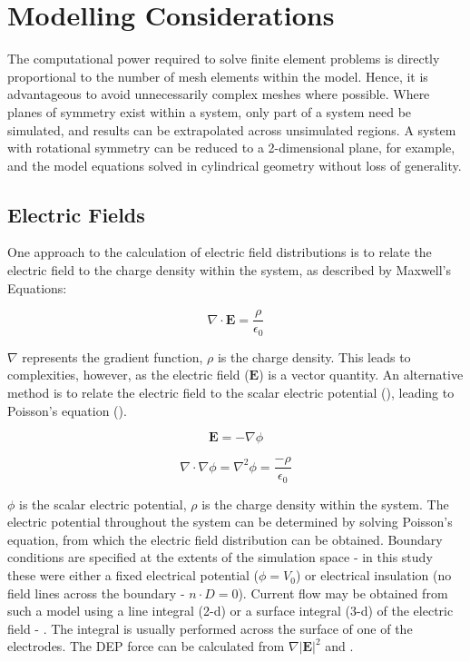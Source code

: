\section{Modelling Considerations}
The computational power required to solve finite element problems is directly proportional to the number of mesh elements within the model. Hence, it is advantageous to avoid unnecessarily complex meshes where possible. Where planes of symmetry exist within a system, only part of a system need be simulated, and results can be extrapolated across unsimulated regions. A system with rotational symmetry can be reduced to a 2-dimensional plane, for example, and the model equations solved in cylindrical geometry without loss of generality.

\subsection{Electric Fields}
One approach to the calculation of electric field distributions is to relate the electric field to the charge density within the system, as described by Maxwell's Equations: 

\begin{equation}
\nabla \cdot \textbf{E} = \frac{\rho}{\epsilon_{0}}
 \label{eqn:e_divergence_relation}
\end{equation} 

$\nabla$ represents the gradient function, $\rho$ is the charge density. This leads to complexities, however, as the electric field ($\textbf{E}$) is a vector quantity. An alternative method is to relate the electric field to the scalar electric potential (), leading to Poisson's equation ().

\begin{equation}
\textbf{E} = - \nabla \phi 
 \label{eqn:e_v_relationship}
\end{equation}

\begin{equation}
\nabla \cdot \nabla \phi = \nabla^{2} \phi = \frac{-\rho}{\epsilon_{0}}
 \label{eqn:poisson_equation}
\end{equation} 

$\phi$ is the scalar electric potential, $\rho$ is the charge density within the system. The electric potential throughout the system can be determined by solving Poisson's equation, from which the electric field distribution can be obtained. Boundary conditions are specified at the extents of the simulation space - in this study these were either a fixed electrical potential ($\phi=V_{0}$) or electrical insulation (no field lines across the boundary - $n \cdot D = 0$). Current flow may be obtained from such a model using a line integral (2-d) or a surface integral (3-d) of the electric field - . The integral is usually performed across the surface of one of the electrodes. The DEP force can be calculated from $\nabla \left| \textbf{E} \right| ^{2}$ and .

